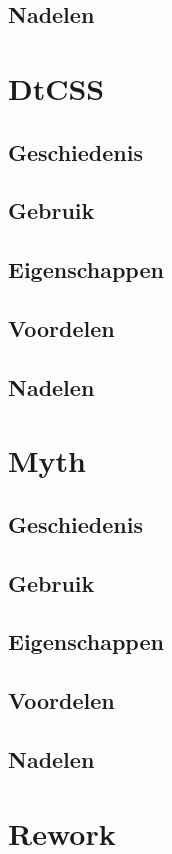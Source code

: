 \documentclass[pdftex,a4paper,12pt,twoside]{report}
\begin{document}
\subsection{Nadelen}


\section{DtCSS}
\subsection{Geschiedenis}
\subsection{Gebruik}
\subsection{Eigenschappen}
\subsection{Voordelen}
\subsection{Nadelen}


\section{Myth}
\subsection{Geschiedenis}
\subsection{Gebruik}
\subsection{Eigenschappen}
\subsection{Voordelen}
\subsection{Nadelen}


\section{Rework}
\end{document}
